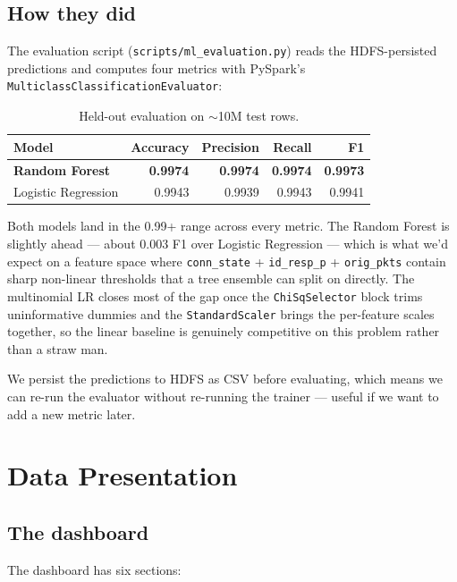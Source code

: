 \documentclass[11pt,a4paper]{article}
\begin{document}
\subsection{How they did}

The evaluation script (\texttt{scripts/ml\_evaluation.py}) reads the
HDFS-persisted predictions and computes four metrics with PySpark's
\texttt{MulticlassClassificationEvaluator}:

\begin{table}[H]
\centering
\small
\begin{tabular}{lrrrr}
\toprule
\textbf{Model} & \textbf{Accuracy} & \textbf{Precision} & \textbf{Recall} & \textbf{F1} \\
\midrule
\textbf{Random Forest}     & \textbf{0.9974} & \textbf{0.9974} & \textbf{0.9974} & \textbf{0.9973} \\
Logistic Regression        & 0.9943 & 0.9939 & 0.9943 & 0.9941 \\
\bottomrule
\end{tabular}
\caption{Held-out evaluation on $\sim$10M test rows.}
\end{table}

Both models land in the 0.99+ range across every metric. The Random
Forest is slightly ahead --- about $0.003$ F1 over Logistic Regression
--- which is what we'd expect on a feature space where
\texttt{conn\_state} + \texttt{id\_resp\_p} + \texttt{orig\_pkts}
contain sharp non-linear thresholds that a tree ensemble can split on
directly. The multinomial LR closes most of the gap once the
\texttt{ChiSqSelector} block trims uninformative dummies and the
\texttt{StandardScaler} brings the per-feature scales together, so the
linear baseline is genuinely competitive on this problem rather than a
straw man.

We persist the predictions to HDFS as CSV before evaluating, which means
we can re-run the evaluator without re-running the trainer --- useful if
we want to add a new metric later.

\section{Data Presentation}

\subsection{The dashboard}

The dashboard has six sections:
\end{document}
